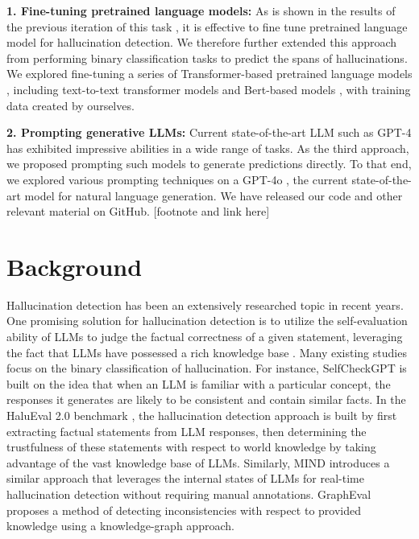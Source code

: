 \documentclass[11pt]{article}
\begin{document}
\textbf{1. Fine-tuning pretrained language models:}  As is shown in the results of the previous iteration of this task \cite{mickus2024semeval}, it is effective to fine tune pretrained language model for hallucination detection. We therefore further extended this approach from performing binary classification tasks to predict the spans of hallucinations. We explored fine-tuning a series of Transformer-based pretrained language models \cite{vaswani2017attention}, including text-to-text transformer models \cite{raffel2020exploring} and Bert-based models \cite{devlin2018bert}, with training data created by ourselves.

\textbf{2. Prompting generative LLMs:} Current state-of-the-art LLM such as GPT-4 \cite{achiam2023gpt} has exhibited impressive abilities in a wide range of tasks. As the third approach, we proposed prompting such models to generate predictions directly. To that end, we explored various prompting techniques on a GPT-4o \cite{hurst2024gpt}, the current state-of-the-art model for natural language generation.
We have released our code and other relevant material on GitHub. 
[footnote and link here]


\section{Background}
Hallucination detection has been an extensively researched topic in recent years. One promising solution for hallucination detection is to utilize the self-evaluation ability of LLMs to judge the factual correctness of a given statement, leveraging the fact that LLMs have possessed a rich knowledge base \cite{li2024dawn, zhang2024self}. Many existing studies focus on the binary classification of hallucination. For instance, SelfCheckGPT \cite{manakul2023selfcheckgpt} is built on the idea that when an LLM is familiar with a particular concept, the responses it generates are likely to be consistent and contain similar facts. In the HaluEval 2.0 benchmark \cite{li2024dawn}, the hallucination detection approach is built by first extracting factual statements from LLM responses, then determining the trustfulness of these statements with respect to world knowledge by taking advantage of the vast knowledge base of LLMs. Similarly, MIND \cite{su2024unsupervised} introduces a similar approach that leverages the internal states of LLMs for real-time hallucination detection without requiring manual annotations. GraphEval \cite{sansford2024grapheval} proposes a method of detecting inconsistencies with respect to provided knowledge using a knowledge-graph approach.
\end{document}
